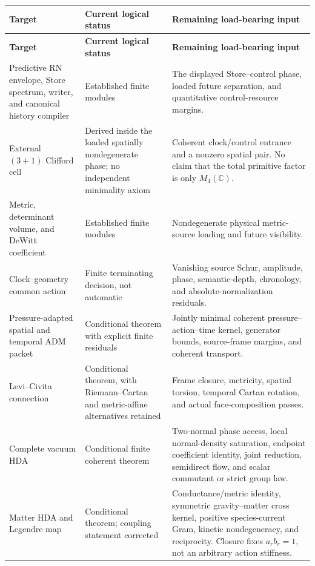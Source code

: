 \documentclass[11pt]{article}
\theoremstyle{definition}
\theoremstyle{remark}
\newcommand{\C}{\mathbb C}
\begin{document}
\begin{longtable}{L{0.25\textwidth}L{0.22\textwidth}L{0.45\textwidth}}
\toprule
\textbf{Target} & \textbf{Current logical status} & \textbf{Remaining load-bearing input}\\
\midrule
\endfirsthead
\toprule
\textbf{Target} & \textbf{Current logical status} & \textbf{Remaining load-bearing input}\\
\midrule
\endhead
Predictive RN envelope, Store spectrum, writer, and canonical history compiler
& Established finite modules
& The displayed Store--control phase, loaded future separation, and quantitative control-resource margins.\\[0.4em]

External \((3+1)\) Clifford cell
& Derived inside the loaded spatially nondegenerate phase; no independent minimality axiom
& Coherent clock/control entrance and a nonzero spatial pair.  No claim that the total primitive factor is only \(M_4(\C)\).\\[0.4em]

Metric, determinant volume, and DeWitt coefficient
& Established finite modules
& Nondegenerate physical metric-source loading and future visibility.\\[0.4em]

Clock--geometry common action
& Finite terminating decision, not automatic
& Vanishing source Schur, amplitude, phase, semantic-depth, chronology, and absolute-normalization residuals.\\[0.4em]

Pressure-adapted spatial and temporal ADM packet
& Conditional theorem with explicit finite residuals
& Jointly minimal coherent pressure--action--time kernel, generator bounds, source-frame margins, and coherent transport.\\[0.4em]

Levi--Civita connection
& Conditional theorem, with Riemann--Cartan and metric-affine alternatives retained
& Frame closure, metricity, spatial torsion, temporal Cartan rotation, and actual face-composition passes.\\[0.4em]

Complete vacuum HDA
& Conditional finite coherent theorem
& Two-normal phase access, local normal-density saturation, endpoint coefficient identity, joint reduction, semidirect flow, and scalar commutant or strict group law.\\[0.4em]

Matter HDA and Legendre map
& Conditional theorem; coupling statement corrected
& Conductance/metric identity, symmetric gravity--matter cross kernel, positive species-current Gram, kinetic nondegeneracy, and reciprocity.  Closure fixes \(a_rb_r=1\), not an arbitrary action stiffness.\\[0.4em]


\end{longtable}
\end{document}
